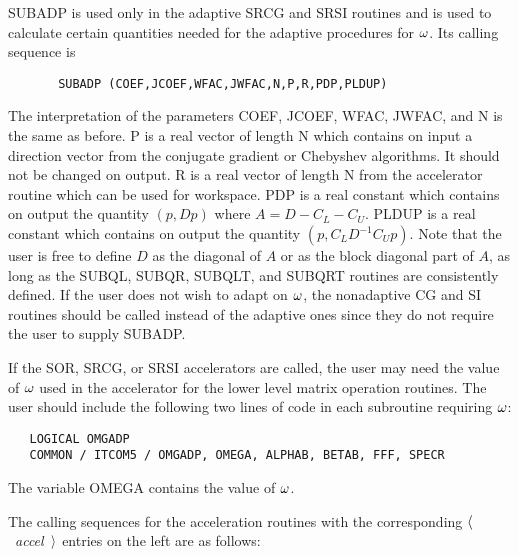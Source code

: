    SUBADP is used only in the adaptive SRCG and SRSI routines 
and is used to calculate certain quantities needed for the adaptive 
procedures for $\omega$.  Its calling sequence is
\begin{verbatim}
       SUBADP (COEF,JCOEF,WFAC,JWFAC,N,P,R,PDP,PLDUP) 
\end{verbatim}
The interpretation of the parameters COEF, JCOEF, WFAC, JWFAC,
and N is the same as before.  P is a real vector of length N which
contains on input a direction vector from the conjugate gradient
or Chebyshev algorithms.  It should not be changed on output.
R is a real vector of length N from the accelerator routine which
can be used for workspace.  PDP is a real constant which contains on
output the quantity $(p,Dp)$ where $A=D-C_L-C_U$.  PLDUP is a real
constant which contains on output the quantity $(p,C_LD^{-1}C_Up)$.
Note that the user is free to define $D$ as the diagonal of $A$ or
as the block diagonal part of $A$, as long as the SUBQL, SUBQR,
SUBQLT, and SUBQRT routines are consistently defined.
If the user does not wish to adapt on $\omega$, the nonadaptive CG and SI
routines should be called instead of the adaptive ones 
since they do not require the user to supply SUBADP.
 
    If the SOR, SRCG, or SRSI accelerators are called, the user
may need the value of $\omega$ used in the accelerator for the
lower level matrix operation routines.  The user should include the
following two lines of code in each subroutine requiring $\omega$:
\begin{verbatim}
   LOGICAL OMGADP
   COMMON / ITCOM5 / OMGADP, OMEGA, ALPHAB, BETAB, FFF, SPECR
\end{verbatim}
The variable OMEGA contains the value of $\omega$.
 
    The calling sequences for the acceleration routines with the
corresponding   $\langle$~{\em accel}~$\rangle$ entries
on the left are as follows:
 
